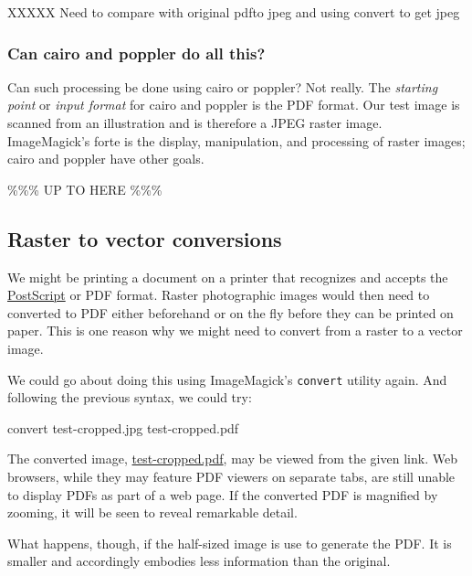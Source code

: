 \documentclass[
  11pt,
  british,
  a4paper,
]{article}
\newenvironment{Shaded}{\begin{snugshade}}{\end{snugshade}}
\newcommand{\ExtensionTok}[1]{\textcolor[rgb]{0.80,0.80,0.80}{#1}}
\newcommand{\NormalTok}[1]{\textcolor[rgb]{0.80,0.80,0.80}{#1}}
\begin{document}
XXXXX Need to compare with original pdfto jpeg and using convert to get
jpeg

\hypertarget{can-cairo-and-poppler-do-all-this}{%
\subsubsection{Can cairo and poppler do all
this?}\label{can-cairo-and-poppler-do-all-this}}

Can such processing be done using cairo or poppler? Not really. The
\emph{starting point} or \emph{input format} for cairo and poppler is
the PDF format. Our test image is scanned from an illustration and is
therefore a JPEG raster image. ImageMagick's forte is the display,
manipulation, and processing of raster images; cairo and poppler have
other goals.

\%\%\% UP TO HERE \%\%\%

\hypertarget{raster-to-vector-conversions}{%
\subsection{Raster to vector
conversions}\label{raster-to-vector-conversions}}

We might be printing a document on a printer that recognizes and accepts
the \href{}{PostScript} or PDF format. Raster photographic images would
then need to converted to PDF either beforehand or on the fly before
they can be printed on paper. This is one reason why we might need to
convert from a raster to a vector image.

We could go about doing this using ImageMagick's \texttt{convert}
utility again. And following the previous syntax, we could try:

\begin{Shaded}
\begin{Highlighting}[]
\ExtensionTok{convert}\NormalTok{ test{-}cropped.jpg test{-}cropped.pdf}
\end{Highlighting}
\end{Shaded}

The converted image, \href{images/test-cropped.pdf}{test-cropped.pdf},
may be viewed from the given link. Web browsers, while they may feature
PDF viewers on separate tabs, are still unable to display PDFs as part
of a web page. If the converted PDF is magnified by zooming, it will be
seen to reveal remarkable detail.

What happens, though, if the half-sized image is use to generate the
PDF. It is smaller and accordingly embodies less information than the
original.
\end{document}
